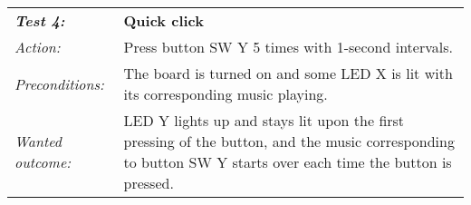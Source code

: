 \vspace{1cm}

\begin{tabular}[h]{|lp{12cm}|} \hline
\textbf{\emph{Test 4:}} 		& \textbf{Quick click}\\
\emph{Action:} 		& Press button SW Y 5 times with 1-second intervals.\\
\emph{Preconditions:}	& The board is turned on and some LED X is lit with its corresponding music playing.\\
\emph{Wanted outcome:}	& LED Y lights up and stays lit upon the first pressing of the button, and the music corresponding to  button SW Y starts over each time the button is pressed.\\ \hline
\end{tabular}